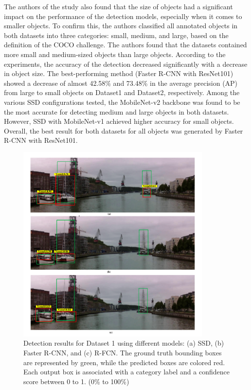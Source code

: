The authors of the study also found that the size of objects had a significant impact on the performance of the detection models, especially when it comes to smaller objects. To confirm this, the authors classified all annotated objects in both datasets into three categories: small, medium, and large, based on the definition of the COCO challenge. The authors found that the datasets contained more small and medium-sized objects than large objects. According to the experiments, the accuracy of the detection decreased significantly with a decrease in object size. The best-performing method (Faster R-CNN with ResNet101) showed a decrease of almost 42.58\% and 73.48\% in the average precision (AP) from large to small objects on Dataset1 and Dataset2, respectively. Among the various SSD configurations tested, the MobileNet-v2 backbone was found to be the most accurate for detecting medium and large objects in both datasets. However, SSD with MobileNet-v1 achieved higher accuracy for small objects. Overall, the best result for both datasets for all objects was generated by Faster R-CNN with ResNet101.
\begin{figure}[H]
    \centering
    \includegraphics[width=\textwidth,height=10cm,keepaspectratio=true]{src/Images/solv_res_1.PNG}
    \caption{
     Detection results for Dataset 1 using different models: (a) SSD, (b) Faster R-CNN, and (c) R-FCN. The ground truth bounding boxes are represented by green, while the predicted boxes are colored red. Each output box is associated with a category label and a confidence score between 0 to 1. (0\% to 100\%)\cite{soloviev2020comparing}
     }
\end{figure}
\\

